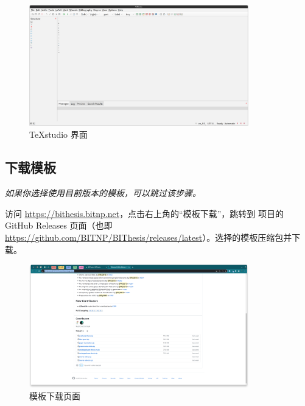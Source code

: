 \begin{figure}[H]
  \begin{center}
    \includegraphics[width=0.85\textwidth]{imgs/texstudio-overview.png}
  \end{center}
  \caption{TeXstudio 界面}
  \label{fig:texstudio-overview}
\end{figure}

\subsection{下载模板}

\textit{如果你选择使用目前版本的模板，可以跳过该步骤。}

访问 \url{https://bithesis.bitnp.net}，点击右上角的“模板下载”，跳转到 \BIThesis 项目的 GitHub Releases 页面（也即 \url{https://github.com/BITNP/BIThesis/releases/latest}）。选择的模板压缩包并下载。


\begin{figure}[H]
  \begin{center}
    \includegraphics[width=0.85\textwidth]{imgs/github-releases.png}
  \end{center}
  \caption{模板下载页面}
  \label{fig:local-template-download}
\end{figure}

